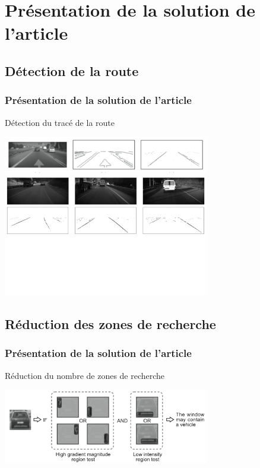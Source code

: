 \section{Présentation de la solution de l'article}


\subsection{Détection de la route}
\begin{frame}
\frametitle{Présentation de la solution de l'article}

Détection du tracé de la route
\begin{center}
  \includegraphics[width=9cm]{image/marquage.png}\\
  \includegraphics[width=9cm]{image/lignes.png}
\end{center}

\end{frame}

\subsection{Réduction des zones de recherche}
\begin{frame}
\frametitle{Présentation de la solution de l'article}

Réduction du nombre de zones de recherche
\begin{center}
  \includegraphics[width=9cm]{image/fenetreVehicule.png}
\end{center}

\end{frame}

